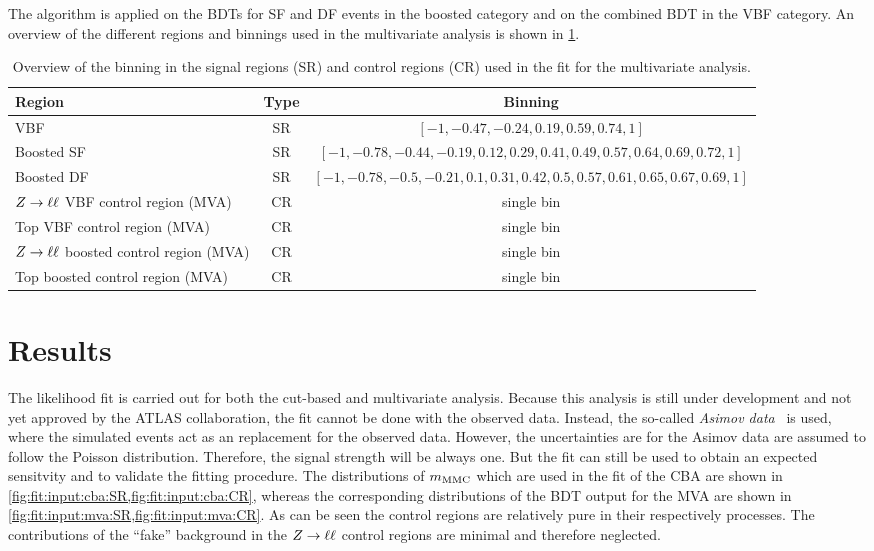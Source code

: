 The algorithm is applied on the BDTs for SF and DF events in the boosted category and on the combined BDT in the VBF category.
An overview of the different regions and binnings used in the multivariate analysis is shown in \cref{tab:fit:regions:mva}.

\begin{table}
    \centering
    \caption{Overview of the binning in the signal regions (SR) and control regions (CR) used in the fit for the multivariate analysis.}\label{tab:fit:regions:mva}
    \begin{tabular}{lcc}
        \toprule
        Region                              & Type  & Binning \\ \midrule
        VBF                                 & SR    & $\left[-1, -0.47, -0.24,  0.19, 0.59, 0.74, 1\right]$ \\
        Boosted SF                          & SR    & $\left[-1, -0.78, -0.44, -0.19, 0.12, 0.29, 0.41, 0.49, 0.57, 0.64, 0.69, 0.72, 1\right]$ \\
        Boosted DF                          & SR    & $\left[-1, -0.78, -0.5,  -0.21, 0.1,  0.31, 0.42, 0.5,  0.57, 0.61, 0.65, 0.67, 0.69, 1\right]$ \\
        $Z \to \ell \ell$ VBF control region (MVA)     & CR    & single bin\\
        Top VBF control region (MVA)        & CR    & single bin\\
        $Z \to \ell \ell$ boosted control region (MVA) & CR    & single bin\\
        Top boosted control region (MVA)    & CR    & single bin\\
    \end{tabular}
\end{table}

\section{Results}\label{sec:fit:results}

The likelihood fit is carried out for both the cut-based and multivariate analysis.
Because this analysis is still under development and not yet approved by the ATLAS collaboration, the fit cannot be done
with the observed data.
Instead, the so-called \emph{Asimov data}~\cite{FitATLAS} is used, where the simulated events act as an replacement for the observed data.
However, the uncertainties are for the Asimov data are assumed to follow the Poisson distribution.
Therefore, the signal strength will be always one.
But the fit can still be used to obtain an expected sensitvity and to validate the fitting procedure.
The distributions of $m_\text{MMC}$ which are used in the fit of the CBA are shown in \cref{fig:fit:input:cba:SR,fig:fit:input:cba:CR}, whereas the
corresponding distributions of the BDT output for the MVA are shown in \cref{fig:fit:input:mva:SR,fig:fit:input:mva:CR}.
As can be seen the control regions are relatively pure in their respectively processes.
The contributions of the ``fake'' background in the $Z \to \ell \ell$ control regions are minimal and therefore neglected.

